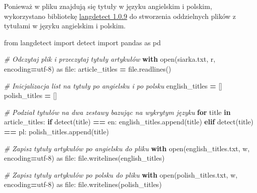 \documentclass[
  12pt,
]{article}
\newenvironment{Shaded}{\begin{snugshade}}{\end{snugshade}}
\newcommand{\BuiltInTok}[1]{#1}
\newcommand{\CommentTok}[1]{\textcolor[rgb]{0.56,0.35,0.01}{\textit{#1}}}
\newcommand{\ControlFlowTok}[1]{\textcolor[rgb]{0.13,0.29,0.53}{\textbf{#1}}}
\newcommand{\ImportTok}[1]{#1}
\newcommand{\KeywordTok}[1]{\textcolor[rgb]{0.13,0.29,0.53}{\textbf{#1}}}
\newcommand{\NormalTok}[1]{#1}
\newcommand{\OperatorTok}[1]{\textcolor[rgb]{0.81,0.36,0.00}{\textbf{#1}}}
\newcommand{\StringTok}[1]{\textcolor[rgb]{0.31,0.60,0.02}{#1}}
\begin{document}
Ponieważ w pliku znajdują się tytuły w języku angielskim i polskim,
wykorzystano bibliotekę
\href{https://pypi.org/project/langdetect/}{langdetect 1.0.9} do
stworzenia oddzielnych plików z tytułami w języku angielskim i polskim.

\begin{Shaded}
\begin{Highlighting}[]

\ImportTok{from}\NormalTok{ langdetect }\ImportTok{import}\NormalTok{ detect}
\ImportTok{import}\NormalTok{ pandas }\ImportTok{as}\NormalTok{ pd}

\CommentTok{\# Odczytaj plik i przeczytaj tytuły artykułów}
\ControlFlowTok{with} \BuiltInTok{open}\NormalTok{(}\StringTok{\textquotesingle{}siarka.txt\textquotesingle{}}\NormalTok{, }\StringTok{\textquotesingle{}r\textquotesingle{}}\NormalTok{, encoding}\OperatorTok{=}\StringTok{\textquotesingle{}utf{-}8\textquotesingle{}}\NormalTok{) }\ImportTok{as} \BuiltInTok{file}\NormalTok{:}
\NormalTok{    article\_titles }\OperatorTok{=} \BuiltInTok{file}\NormalTok{.readlines()}

\CommentTok{\# Inicjalizacja list na tytuły po angielsku i po polsku}
\NormalTok{english\_titles }\OperatorTok{=}\NormalTok{ []}
\NormalTok{polish\_titles }\OperatorTok{=}\NormalTok{ []}

\CommentTok{\# Podział tytułów na dwa zestawy bazując na wykrytym języku}
\ControlFlowTok{for}\NormalTok{ title }\KeywordTok{in}\NormalTok{ article\_titles:}
    \ControlFlowTok{if}\NormalTok{ detect(title) }\OperatorTok{==} \StringTok{\textquotesingle{}en\textquotesingle{}}\NormalTok{:}
\NormalTok{        english\_titles.append(title)}
    \ControlFlowTok{elif}\NormalTok{ detect(title) }\OperatorTok{==} \StringTok{\textquotesingle{}pl\textquotesingle{}}\NormalTok{:}
\NormalTok{        polish\_titles.append(title)}

\CommentTok{\# Zapisz tytuły artykułów po angielsku do pliku}
\ControlFlowTok{with} \BuiltInTok{open}\NormalTok{(}\StringTok{\textquotesingle{}english\_titles.txt\textquotesingle{}}\NormalTok{, }\StringTok{\textquotesingle{}w\textquotesingle{}}\NormalTok{, encoding}\OperatorTok{=}\StringTok{\textquotesingle{}utf{-}8\textquotesingle{}}\NormalTok{) }\ImportTok{as} \BuiltInTok{file}\NormalTok{:}
    \BuiltInTok{file}\NormalTok{.writelines(english\_titles)}

\CommentTok{\# Zapisz tytuły artykułów po polsku do pliku}
\ControlFlowTok{with} \BuiltInTok{open}\NormalTok{(}\StringTok{\textquotesingle{}polish\_titles.txt\textquotesingle{}}\NormalTok{, }\StringTok{\textquotesingle{}w\textquotesingle{}}\NormalTok{, encoding}\OperatorTok{=}\StringTok{\textquotesingle{}utf{-}8\textquotesingle{}}\NormalTok{) }\ImportTok{as} \BuiltInTok{file}\NormalTok{:}
    \BuiltInTok{file}\NormalTok{.writelines(polish\_titles)}
\end{Highlighting}
\end{Shaded}
\end{document}
